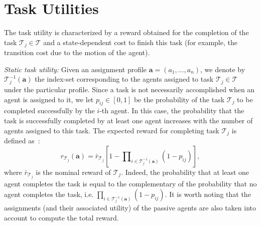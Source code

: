 \documentclass{ifacconf}
\newcommand{\cT}{\mathcal{T}}
\begin{document}
\section{Task Utilities}\label{s:utility}

The task utility is characterized by a reward obtained for the completion of the task $\cT_j \in \cT$ and a state-dependent cost to finish this task (for example, the transition cost due to the motion of the agent).


\noindent \textit{Static task utility:} Given an assignment profile $\bm{a} = (a_1, \dots, a_n)$, we denote by $\cT^{-1}_j( \bm{a} )$ the index-set corresponding to the agents assigned to task $\cT_j \in \cT$ under the particular profile. Since a task is not necessarily accomplished when an agent is assigned to it, we let $p_{ij} \in [0,1]$ be the probability of the task $\cT_j$ to be completed successfully by the $i$-th agent. In this case, the probability that the task is successfully completed by at least one agent increases with the number of agents assigned to this task.
The expected reward for completing task $\cT_j$ is defined as~\cite{p:bakolas2020}:
\begin{equation}
r_{\cT_j}(\bm{a}) = \bar{r}_{\cT_j}\left[1-\prod\nolimits_{i \in \mathcal{T}_j^{-1} (\bm{a})} (1-p_{ij})\right], \label{eq}
\end{equation}
where $\bar{r}_{\cT_j}$ is the nominal reward of $\cT_j$. Indeed, the probability that at least one agent completes the task is equal to the complementary of the probability that no agent completes the task, i.e. $\prod\nolimits_{i \in \mathcal{T}_j^{-1} (\bm{a})} (1-p_{ij})$.
It is worth noting that the assignments (and their associated utility) of the passive agents are also taken into account to compute the total reward.
\end{document}
